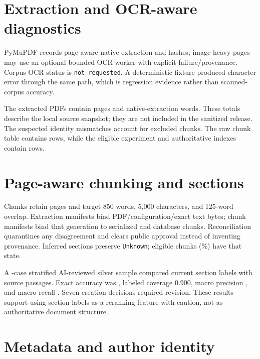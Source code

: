 \section{Extraction and OCR-aware diagnostics}

PyMuPDF records page-aware native extraction and hashes; image-heavy pages may use an optional bounded OCR worker with explicit failure/provenance. Corpus OCR status is \texttt{not\_requested}. A deterministic fixture produced character error \VTwoOCRCharacterErrorRate{} through the same path, which is regression evidence rather than scanned-corpus accuracy.

The \AvailablePdfCount{} extracted PDFs contain \ExtractedPageCount{} pages and \ExtractedWordCount{} native-extraction words. These totals describe the local source snapshot; they are not included in the sanitized release. The suspected identity mismatches account for \MismatchChunkCount{} excluded chunks. The raw chunk table contains \RawChunkCount{} rows, while the eligible experiment and authoritative indexes contain \EligibleChunkCount{} rows.

\section{Page-aware chunking and sections}

Chunks retain pages and target 850 words, 5,000 characters, and 125-word overlap. Extraction manifests bind PDF/configuration/exact text bytes; chunk manifests bind that generation to serialized and database chunks. Reconciliation quarantines any disagreement and clears public approval instead of inventing provenance. Inferred sections preserve \texttt{Unknown}; \EligibleUnknownChunkCount{} eligible chunks (\EligibleUnknownChunkPercent\%) have that state.

A \SectionSilverCaseCount{}-case stratified AI-reviewed silver sample compared current section labels with source passages. Exact accuracy was \SectionSilverAccuracy{}, labeled coverage 0.900, macro precision \SectionSilverMacroPrecision{}, and macro recall \SectionSilverMacroRecall{}. Seven creation decisions required revision. These results support using section labels as a reranking feature with caution, not as authoritative document structure.

\section{Metadata and author identity}

